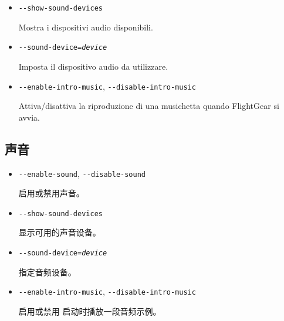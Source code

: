 \begin{itemize}
{\begin{itemize}
    Attiva/Disattiva i suoni del simulatore.

  \item{\texttt{-$ $-show-sound-devices}}

    Mostra i dispositivi audio disponibili.

  \item{\texttt{-$ $-sound-device={\it device}}}

    Imposta il dispositivo audio da utilizzare.

  \item{\texttt{-$ $-enable-intro-music}, \texttt{-$ $-disable-intro-music}}

    Attiva/disattiva la riproduzione di una musichetta quando FlightGear si avvia.

  \end{itemize}

}

\ifchinese
{
  \subsection{声音}
  \begin{itemize}
  \item{\texttt{-$ $-enable-sound}, \texttt{-$ $-disable-sound}}
 
   启用或禁用声音。

  \item{\texttt{-$ $-show-sound-devices}}

   显示可用的声音设备。
  
  \item{\texttt{-$ $-sound-device={\it device}}}
   
   指定音频设备。

  \item{\texttt{-$ $-enable-intro-music}, \texttt{-$ $-disable-intro-music}}

    启用或禁用 \FlightGear{} 启动时播放一段音频示例。

  \end{itemize}
}
\fi



\end{itemize}
